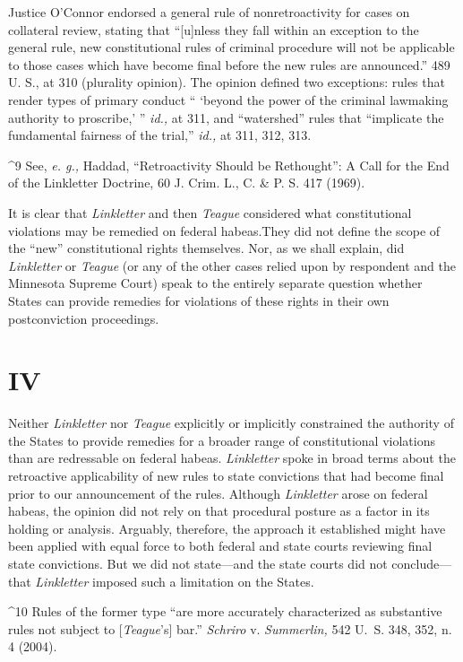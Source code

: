 {{{  Justice O'Connor endorsed a general rule of nonretroactivity for
cases on collateral review, stating that ``[u]nless they fall within
an exception to the general rule, new constitutional rules of criminal
procedure will not be applicable to those cases which have become final
before the new rules are announced.'' 489 U. S., at 310 (plurality
opinion). The opinion defined two exceptions: rules that render
types of primary conduct `` ‘beyond the power of the criminal
lawmaking authority to proscribe,' '' \emph{id.,} at 311, and
``watershed'' \newpage  rules that ``implicate the fundamental fairness
of the trial,'' \emph{id.,} at 311, 312, 313.\footnotemark[10]

^9 See, \emph{e. g.,} Haddad, ``Retroactivity Should be Rethought'': A
Call for the End of the Linkletter Doctrine, 60 J. Crim. L., C. \& P. S.
417 (1969).

  It is clear that \emph{Linkletter} and then \emph{Teague} considered what
constitutional violations may be remedied on federal habeas.\footnotemark[11]
They did not define the scope of the ``new'' constitutional rights
themselves. Nor, as we shall explain, did \emph{Linkletter} or \emph{Teague}
(or any of the other cases relied upon by respondent and the Minnesota
Supreme Court) speak to the entirely separate question whether States
can provide remedies for violations of these rights in their own
postconviction proceedings.

\section{IV}

  Neither \emph{Linkletter} nor \emph{Teague} explicitly or implicitly
constrained the authority of the States to provide remedies for a
broader range of constitutional violations than are redressable
on federal habeas. \emph{Linkletter} spoke in broad terms about the
retroactive applicability of new rules to state convictions that
had become final prior to our announcement of the rules. Although
\emph{Linkletter} arose on federal habeas, the opinion did not rely
on that procedural posture as a factor in its holding or analysis.
Arguably, therefore, the approach it established might have been
applied with equal force to both federal and state courts reviewing
final state convictions. But we did not state---and the state courts
did not conclude---that \emph{Linkletter} imposed such a limitation on the
States.\footnotemark[12] \newpage 

^10 Rules of the former type ``are more accurately characterized as
substantive rules not subject to [\emph{Teague}'s] bar.'' \emph{Schriro}
v. \emph{Summerlin,} 542 U.~S. 348, 352, n. 4 (2004).

}}}
